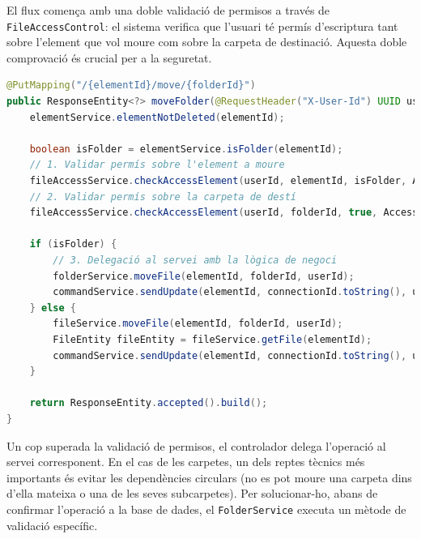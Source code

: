El flux comença amb una doble validació de permisos a través de \texttt{FileAccessControl}: el sistema verifica que l'usuari té permís d'escriptura tant sobre l'element que vol moure com sobre la carpeta de destinació. Aquesta doble comprovació és crucial per a la seguretat.

\begin{lstlisting}[language=Java, caption={Endpoint específic per moure un element a `ElementController`}]
@PutMapping("/{elementId}/move/{folderId}")
public ResponseEntity<?> moveFolder(@RequestHeader("X-User-Id") UUID userId, @RequestHeader("X-Connection-Id") UUID connectionId, @PathVariable("elementId") UUID elementId, @PathVariable("folderId") UUID folderId) {
    elementService.elementNotDeleted(elementId);
    
    boolean isFolder = elementService.isFolder(elementId);
    // 1. Validar permís sobre l'element a moure
    fileAccessService.checkAccessElement(userId, elementId, isFolder, AccessType.WRITE);
    // 2. Validar permís sobre la carpeta de destí
    fileAccessService.checkAccessElement(userId, folderId, true, AccessType.WRITE);

    if (isFolder) {
        // 3. Delegació al servei amb la lògica de negoci
        folderService.moveFile(elementId, folderId, userId);
        commandService.sendUpdate(elementId, connectionId.toString(), userId.toString(), folderService.getFolderByElementId(folderId, false), "", "", "folder");
    } else {
        fileService.moveFile(elementId, folderId, userId);
        FileEntity fileEntity = fileService.getFile(elementId);
        commandService.sendUpdate(elementId, connectionId.toString(), userId.toString(), folderService.getFolderByElementId(folderId, false), fileService.getHash(fileEntity.getId()), fileEntity.getName(), "file");
    }

    return ResponseEntity.accepted().build();
}
\end{lstlisting}

Un cop superada la validació de permisos, el controlador delega l'operació al servei corresponent. En el cas de les carpetes, un dels reptes tècnics més importants és evitar les dependències circulars (no es pot moure una carpeta dins d'ella mateixa o una de les seves subcarpetes). Per solucionar-ho, abans de confirmar l'operació a la base de dades, el \texttt{FolderService} executa un mètode de validació específic.

